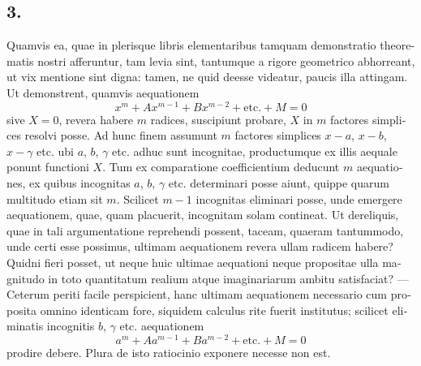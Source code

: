 \documentclass[12pt,a4paper]{article}
\begin{document}
\begin{otherlanguage}{latin}
\subsection*{3.}
Quamvis ea, quae in plerisque libris elementaribus tamquam demonstratio theorematis nostri afferuntur, tam levia sint, tantumque a rigore geometrico abhorreant, ut vix mentione sint digna: tamen, ne quid deesse videatur, paucis illa attingam. Ut demonstrent, quamvis aequationem
\[x^{m}+Ax^{m-1}+Bx^{m-2}+\text{etc.}+M=0\]
sive $X=0$, revera habere $m$ radices, suscipiunt probare, $X$ in $m$ factores simplices resolvi posse. Ad hunc finem assumunt $m$ factores simplices $x-a$, $x-b$, $x-\gamma$ etc. ubi $a$, $b$, $\gamma$ etc. adhuc sunt incognitae, productumque ex illis aequale ponunt functioni $X$. Tum ex comparatione coefficientium deducunt $m$ aequationes, ex quibus incognitas $a$, $b$, $\gamma$ etc. determinari posse aiunt, quippe quarum multitudo etiam sit $m$. Scilicet $m-1$ incognitas eliminari posse, unde emergere aequationem, quae, quam placuerit, incognitam solam contineat. Ut dereliquis, quae in tali argumentatione reprehendi possent, taceam, quaeram tantummodo, unde certi esse possimus, ultimam aequationem revera ullam radicem habere? Quidni fieri posset, ut neque huic ultimae aequationi neque propositae ulla magnitudo in toto quantitatum realium atque imaginariarum ambitu satisfaciat? --- Ceterum periti facile perspicient, hanc ultimam aequationem necessario cum proposita omnino identicam fore, siquidem calculus rite fuerit institutus; scilicet eliminatis incognitis $b$, $\gamma$ etc. aequationem
\[a^{m}+Aa^{m-1}+Ba^{m-2}+\text{etc.}+M=0\]
prodire debere. Plura de isto ratiocinio exponere necesse non est.


\end{otherlanguage}
\end{document}

